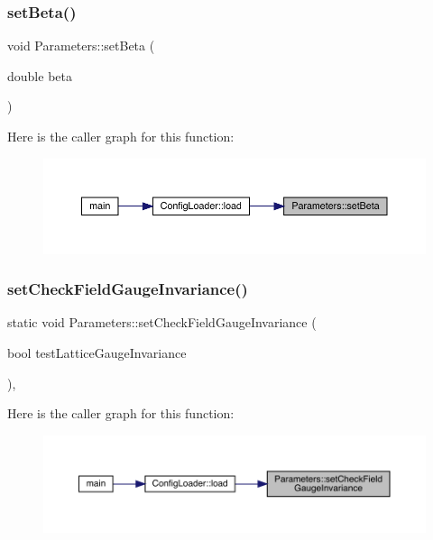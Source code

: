 \subsubsection{\texorpdfstring{setBeta()}{setBeta()}}
{\footnotesize\ttfamily void Parameters\+::set\+Beta (\begin{DoxyParamCaption}\item[{double}]{beta }\end{DoxyParamCaption})\hspace{0.3cm}{\ttfamily [static]}}

Here is the caller graph for this function\+:
\nopagebreak
\begin{figure}[H]
\begin{center}
\leavevmode
\includegraphics[width=350pt]{class_parameters_a8462149cb29ecf936f1f9945f5de4908_icgraph}
\end{center}
\end{figure}
\mbox{\label{class_parameters_ad6a40d1cf972c0f1379cf011bb7da2b1}} 
\subsubsection{\texorpdfstring{setCheckFieldGaugeInvariance()}{setCheckFieldGaugeInvariance()}}
{\footnotesize\ttfamily static void Parameters\+::set\+Check\+Field\+Gauge\+Invariance (\begin{DoxyParamCaption}\item[{bool}]{test\+Lattice\+Gauge\+Invariance }\end{DoxyParamCaption})\hspace{0.3cm}{\ttfamily [inline]}, {\ttfamily [static]}}

Here is the caller graph for this function\+:
\nopagebreak
\begin{figure}[H]
\begin{center}
\leavevmode
\includegraphics[width=350pt]{class_parameters_ad6a40d1cf972c0f1379cf011bb7da2b1_icgraph}
\end{center}
\end{figure}
\mbox{\label{class_parameters_a4863c437df48cd3242fdb67221a3d6ed}} 
